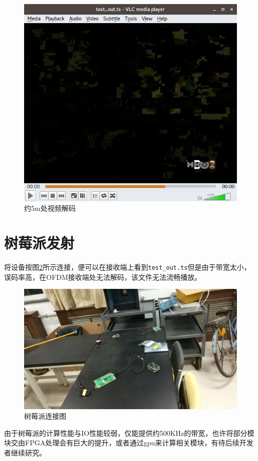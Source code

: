 		\begin{figure}[htp]
			\centering
			\includegraphics[width=13cm]{figures/dvbt_rx_TS_broken.png}
			\caption{约5m处视频解码}
			\label{fig:dvbt_rx_TS_broken}
		\end{figure}
	\section{树莓派发射}
		\par 将设备按图\ref{fig:dvbt_raspi}所示连接，便可以在接收端上看到\lstinline[language=sh]{test_out.ts}但是由于带宽太小，误码率高，在OFDM接收端处无法解码，该文件无法流畅播放。
		\begin{figure}[htp]
			\centering
			\includegraphics[width=13cm]{figures/dvbt_raspi.jpg}
			\caption{树莓派连接图}
			\label{fig:dvbt_raspi}
		\end{figure}
		\par 由于树莓派的计算性能与IO性能较弱，仅能提供约500KHz的带宽，也许将部分模块交由FPGA处理会有巨大的提升，或者通过gpu来计算相关模块，有待后续开发者继续研究。
